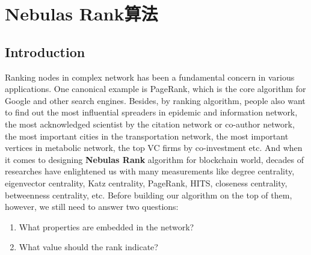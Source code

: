 \section{Nebulas Rank算法}


\subsection{Introduction} \label{sec:intro}
Ranking nodes in complex network has been a fundamental concern in various applications. One canonical example is PageRank\cite{Brin2010}\cite{page1999pagerank}, which is the core algorithm for Google and other search engines\cite{langville2011google}. Besides, by ranking algorithm, people also want to find out the most influential spreaders in epidemic and information network\cite{doerr2012rumors}\cite{Kitsak2010}, the most acknowledged scientist by the citation network or co-author network\cite{walker2007ranking}\cite{chen2007finding}\cite{Radicchi2009}, the most important cities in the transportation network\cite{guimera2005worldwide}, the most important vertices in metabolic network\cite{ivan2010web}, the top VC firms by co-investment\cite{Bhat2012} etc. And when it comes to designing \textbf{Nebulas Rank} algorithm for blockchain world, decades of researches have enlightened us with many measurements like degree centrality\cite{freeman1979set}, eigenvector centrality\cite{bonacich1972factoring}, Katz centrality\cite{katz1953new}, PageRank\cite{Brin2010}, HITS\cite{kleinberg1999authoritative}, closeness centrality\cite{sabidussi1966centrality}, betweenness centrality\cite{freeman1977set}\cite{freeman1978centrality}\cite{freeman1991centrality}\cite{noh2004random}\cite{newman2005measure}, etc. Before building our algorithm on the top of them, however, we still need to answer two questions:
\begin{enumerate}
\item What properties are embedded in the network?
\item What value should the rank indicate?
\end{enumerate}
